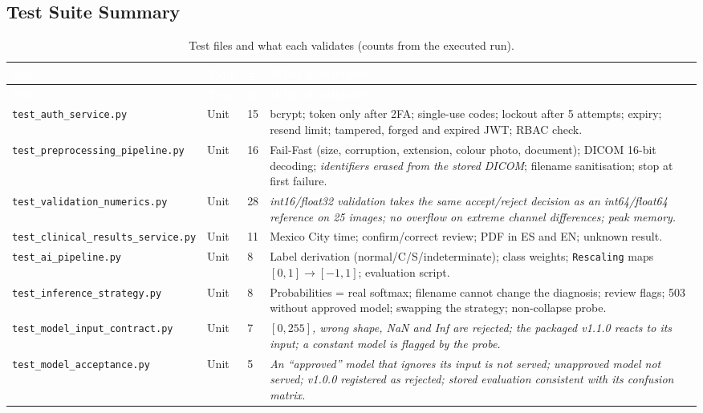 \documentclass[12pt,a4paper]{article}
\newcommand{\fp}[1]{\nolinkurl{#1}}
\newcommand{\hd}[1]{\textcolor{white}{\textbf{#1}}}
\begin{document}
\subsection{Test Suite Summary}

\begin{longtable}{L{4.6cm} C{1.4cm} C{0.5cm} p{7.0cm}}
\caption{Test files and what each validates (counts from the executed run).}\label{tab:tests}\\
\hd{File} & \hd{Type} & \hd{\#} & \hd{What it validates} \\
\endfirsthead
{}
\hd{File} & \hd{Type} & \hd{\#} & \hd{What it validates} \\
\endhead
{}
\fp{test_auth_service.py} & Unit & 15 & bcrypt; token only after 2FA; single-use codes; lockout after 5 attempts; expiry; resend limit; tampered, forged and expired JWT; RBAC check. \\
\fp{test_preprocessing_pipeline.py} & Unit & 16 & Fail-Fast (size, corruption, extension, colour photo, document); DICOM 16-bit decoding; \emph{identifiers erased from the stored DICOM}; filename sanitisation; stop at first failure. \\
\fp{test_validation_numerics.py} & Unit & 28 & \emph{int16/float32 validation takes the same accept/reject decision as an int64/float64 reference on 25 images; no overflow on extreme channel differences; peak memory.} \\
\fp{test_clinical_results_service.py} & Unit & 11 & Mexico City time; confirm/correct review; PDF in ES and EN; unknown result. \\
\fp{test_ai_pipeline.py} & Unit & 8 & Label derivation (normal/C/S/indeterminate); class weights; \texttt{Rescaling} maps $[0,1]\to[-1,1]$; evaluation script. \\
\fp{test_inference_strategy.py} & Unit & 8 & Probabilities = real softmax; filename cannot change the diagnosis; review flags; 503 without approved model; swapping the strategy; non-collapse probe. \\
\fp{test_model_input_contract.py} & Unit & 7 & \emph{$[0,255]$, wrong shape, NaN and Inf are rejected; the packaged v1.1.0 reacts to its input; a constant model is flagged by the probe.} \\
\fp{test_model_acceptance.py} & Unit & 5 & \emph{An ``approved'' model that ignores its input is not served; unapproved model not served; v1.0.0 registered as rejected; stored evaluation consistent with its confusion matrix.} \\

\end{longtable}
\end{document}
